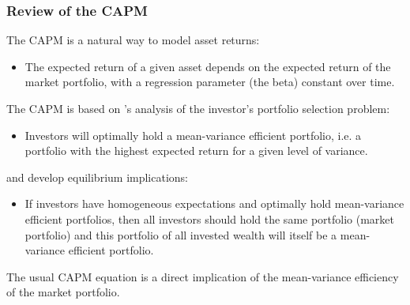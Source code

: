 \documentclass[xcolor=dvipsnames, english, 8pt]{beamer}
\begin{document}
    \begin{frame}
        \frametitle{Review of the CAPM}
        The CAPM is a natural way to model asset returns:\vspace{0.25cm}\\
        \begin{itemize}
            \item The expected return of a given asset depends on the expected return of the market portfolio, with a regression parameter (the beta) constant over time. \vspace{0.25cm}\\
        \end{itemize}
        The CAPM is based on \cite{Markowitz1952a}'s analysis of the investor's portfolio selection problem:\vspace{0.25cm}\\
    \begin{itemize}
        \item Investors will optimally hold a mean-variance efficient portfolio, i.e. a portfolio with the highest expected return for a given level of variance.\vspace{0.25cm}\\
    \end{itemize}
    \cite{SHARPE1964} and \cite{Lintner1965} develop equilibrium implications:\vspace{0.25cm}\\
    \begin{itemize}
        \item If investors have homogeneous expectations and optimally hold mean-variance efficient portfolios, then all investors should hold the same portfolio (market portfolio) and this portfolio of all invested wealth will itself be a mean-variance efficient portfolio.\vspace{0.25cm}\\
    \end{itemize}
    The usual CAPM equation is a direct implication of the mean-variance efficiency of the market portfolio.
    \end{frame}
\end{document}
